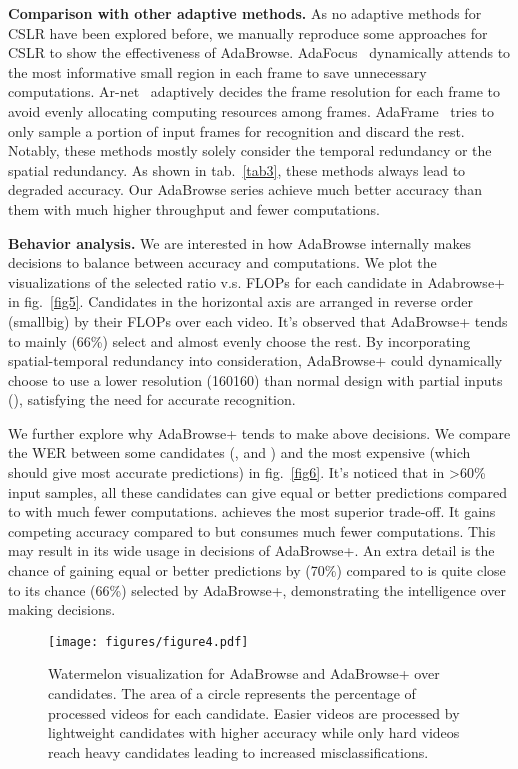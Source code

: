 \documentclass[sigconf]{acmart}
\begin{document}
\label{comp_ada}
\textbf{Comparison with other adaptive methods.} As no adaptive methods for CSLR have been explored before, we manually reproduce some approaches for CSLR to show the effectiveness of AdaBrowse. AdaFocus~\cite{wang2021adaptive} dynamically attends to the most informative small region in each frame to save unnecessary computations. Ar-net~\cite{meng2020ar} adaptively decides the frame resolution for each frame to avoid evenly allocating computing resources among frames. AdaFrame~\cite{wu2019adaframe} tries to only sample a portion of input frames for recognition and discard the rest. Notably, these methods mostly solely consider the temporal redundancy or the spatial redundancy. As shown in tab.~\ref{tab3}, these methods always lead to degraded accuracy. Our AdaBrowse series achieve much better accuracy than them with much higher throughput and fewer computations.

\textbf{Behavior analysis.} We are interested in how AdaBrowse internally makes decisions to balance between accuracy and computations. We plot the visualizations of the selected ratio v.s. FLOPs for each candidate in Adabrowse+ in fig.~\ref{fig5}. Candidates in the horizontal axis are arranged in reverse order (smallbig) by their FLOPs over each video. It's observed that AdaBrowse+ tends to mainly (66\%) select  and almost evenly choose the rest. By incorporating spatial-temporal redundancy into consideration, AdaBrowse+ could dynamically choose to use a lower resolution (160160) than normal design with partial inputs (), satisfying the need for accurate recognition. 

We further explore why AdaBrowse+ tends to make above decisions. We compare the WER between some candidates (,  and ) and the most expensive  (which should give most accurate predictions) in fig.~\ref{fig6}. It's noticed that in \textgreater 60\% input samples, all these candidates can give equal or better predictions compared to  with much fewer computations.  achieves the most superior trade-off. It gains competing accuracy compared to  but consumes much fewer computations. This may result in its wide usage in decisions of AdaBrowse+. An extra detail is the chance of gaining equal or better predictions by  (70\%) compared to  is quite close to its chance (66\%) selected by AdaBrowse+, demonstrating the intelligence over making decisions.

  \begin{figure}[t]
    \centering
    \texttt{[image: figures/figure4.pdf]} 
    \caption{Watermelon visualization for AdaBrowse and AdaBrowse+ over candidates. The area of a circle represents the percentage of processed videos for each candidate. Easier videos are processed by lightweight candidates with higher accuracy while only hard videos reach heavy candidates leading to increased misclassifications.}
    \label{fig8}
  \end{figure}
  
\end{document}
